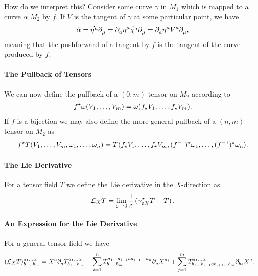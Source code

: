 How do we interpret this? Consider some curve $\gamma$ in $M_{1}$ which is mapped to a curve $\alpha$ $M_{2}$ by $f$. If $V$ is the tangent of $\gamma$ at some particular point, we have
\begin{align*}
	\dot{\alpha} = \dot{\eta^{\mu}}\partial^{}_{\mu} = \partial^{}_{a}\eta^{\mu}\dot{\chi^{a}}\partial^{}_{\mu} = \partial^{}_{a}\eta^{\mu}V^{a}\partial^{}_{\mu},
\end{align*}
meaning that the pushforward of a tangent by $f$ is the tangent of the curve produced by $f$.

\paragraph{The Pullback of Tensors}
We can now define the pullback of a $(0, m)$ tensor on $M_{2}$ according to
\begin{align*}
	f^{\star}\omega(V_{1}, \dots, V_{m}) = \omega(f_{\star}V_{1}, \dots, f_{\star}V_{m}).
\end{align*}
If $f$ is a bijection we may also define the more general pullback of a $(n, m)$ tensor on $M_{2}$ as
\begin{align*}
	f^{\star}T(V_{1}, \dots, V_{m}, \omega_{1}, \dots, \omega_{n}) = T(f_{\star}V_{1}, \dots, f_{\star}V_{m}, (f^{-1})^{\star}\omega_{1}, \dots, (f^{-1})^{\star}\omega_{n}).
\end{align*}

\paragraph{The Lie Derivative}
For a tensor field $T$ we define the Lie derivative in the $X$-direction as
\begin{align*}
	\mathcal{L}_{X}T = \lim\limits_{\varepsilon\to 0}\frac{1}{\varepsilon}\left(\gamma_{\varepsilon X}^{\star}T - T\right).
\end{align*}

\paragraph{An Expression for the Lie Derivative}
For a general tensor field we have
\begin{align*}
	\tensor*{(\lied{X}{T})}{^{a_{1}\dots a_{n}}_{b_{1}\dots b_{m}}} &= X^{a}\del{a}{\tensor*{T}{^{a_{1}\dots a_{n}}_{b_{1}\dots b_{m}}}} - \sum\limits_{i = 1}^{n}\tensor*{T}{^{a_{1}\dots a_{i - 1}aa_{i + 1}\dots a_{n}}_{b_{1}\dots b_{m}}}\del{a}{X^{a_{i}}} + \sum\limits_{j = 1}^{m}\tensor*{T}{^{a_{1}\dots a_{n}}_{b_{1}\dots b_{i - 1}ab_{i + 1}\dots b_{m}}}\del{b_{j}}{X^{a}}.
\end{align*}

